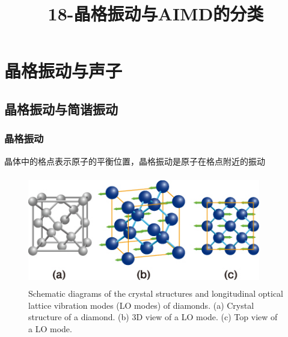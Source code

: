 {{\begin{figure}[h!]
\label{Rashba_effect_2}
\end{figure}
}
\title{18-晶格振动与\rm{AIMD}的分类}
\section{晶格振动与声子}
\subsection{晶格振动与简谐振动}
\frame
{
	\frametitle{晶格振动}
		晶体中的格点表示原子的平衡位置，晶格振动是原子在格点附近的振动
\begin{figure}[h!]
\centering
\vspace*{-0.1in}
\includegraphics[height=1.9in,width=4.0in,viewport=0 0 400 185,clip]{Figures/Schematic-diagrams-of-the-crystal-structures-and-longitudinal-optical-lattice-vibration-modes-(LO_modes)-of-diamonds.jpg}
\caption{\tiny \textrm{Schematic diagrams of the crystal structures and longitudinal optical lattice vibration modes (LO modes) of diamonds. (a) Crystal structure of a diamond. (b) 3D view of a LO mode. (c) Top view of a LO mode.}}%
\label{lattice-virbration}
\end{figure} 
}

}
